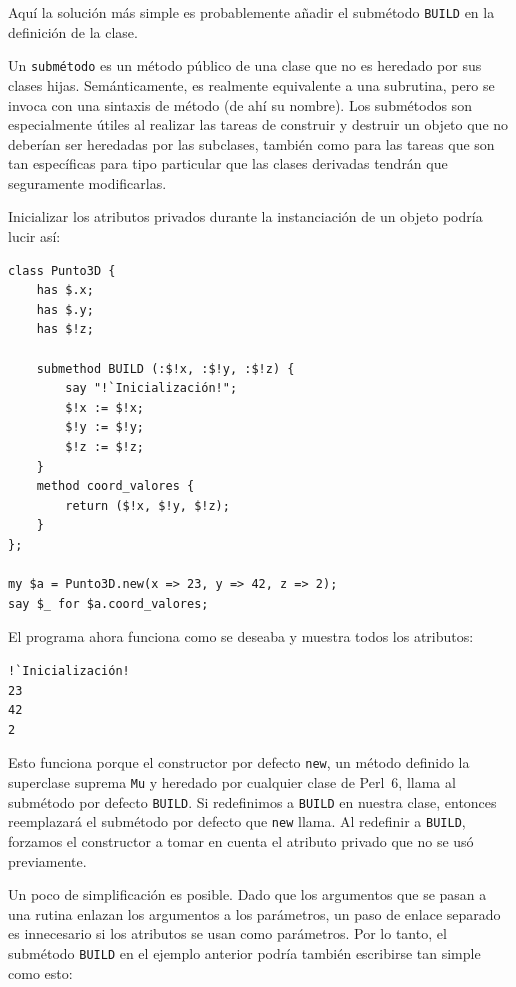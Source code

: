 Aquí la solución más simple es probablemente añadir el 
submétodo {\tt BUILD}  en la definición de la clase.

Un {\tt submétodo} es un método público de una clase que 
no es heredado por sus clases hijas. Semánticamente, es realmente
equivalente a una subrutina, pero se invoca con una sintaxis 
de método (de ahí su nombre). Los submétodos son especialmente útiles
al realizar las tareas de construir y destruir un objeto que no 
deberían ser heredadas por las subclases, también como para las
tareas que son tan específicas para tipo particular que las clases
derivadas tendrán que seguramente modificarlas.

Inicializar los atributos privados durante la instanciación de un objeto
podría lucir así:

\begin{lstlisting}
class Punto3D {
    has $.x;
    has $.y;
    has $!z;

    submethod BUILD (:$!x, :$!y, :$!z) {
        say "!`Inicialización!";
        $!x := $!x; 
        $!y := $!y; 
        $!z := $!z;
    }
    method coord_valores {
        return ($!x, $!y, $!z);
    }
};

my $a = Punto3D.new(x => 23, y => 42, z => 2);
say $_ for $a.coord_valores;
\end{lstlisting}

El programa ahora funciona como se deseaba y muestra 
todos los atributos:

\begin{lstlisting}
!`Inicialización!
23
42
2
\end{lstlisting}

Esto funciona porque el constructor por defecto {\tt new},
un método definido la superclase suprema {\tt Mu} y heredado
por cualquier clase de Perl~6, llama al submétodo por defecto
{\tt BUILD}. Si redefinimos a {\tt BUILD} en nuestra clase, entonces
reemplazará el submétodo por defecto que {\tt new} llama. Al redefinir
a {\tt BUILD}, forzamos el constructor a tomar en cuenta el
atributo privado que no se usó previamente.

Un poco de simplificación es posible. Dado que los argumentos
que se pasan a una rutina enlazan los argumentos a los parámetros,
un paso de enlace separado es innecesario si los atributos se usan
como parámetros. Por lo tanto, el submétodo {\tt BUILD} en el ejemplo
anterior podría también escribirse tan simple como esto:

